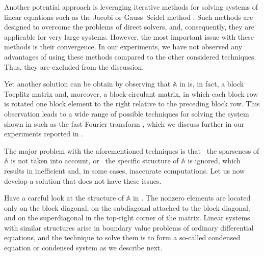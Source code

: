 Another potential approach is leveraging iterative methods for solving systems
of linear equations such as the Jacobi or Gauss--Seidel method \cite{press2007}.
Such methods are designed to overcome the problems of direct solvers, and,
consequently, they are applicable for very large systems. However, the most
important issue with these methods is their convergence. In our experiments, we
have not observed any advantages of using these methods compared to the other
considered techniques. Thus, they are excluded from the discussion.

Yet another solution can be obtain by observing that $\mathbb{A}$ in
 is, in fact, a block Toeplitz matrix and,
moreover, a block-circulant matrix, in which each block row is rotated one block
element to the right relative to the preceding block row. This observation leads
to a wide range of possible techniques for solving the system shown in
 such as the fast Fourier transform
\cite{mazancourt1983}, which we discuss further in our experiments reported in
.

The major problem with the aforementioned techniques is that \one~the sparseness
of $\mathbb{A}$ is not taken into account, or \two~the specific structure of
$\mathbb{A}$ is ignored, which results in inefficient and, in some cases,
inaccurate computations. Let us now develop a solution that does not have these
issues.

Have a careful look at the structure of $\mathbb{A}$ in
. The nonzero elements are located only on the
block diagonal, on the subdiagonal attached to the block diagonal, and on the
superdiagonal in the top-right corner of the matrix. Linear systems with similar
structures arise in boundary value problems of ordinary differential equations,
and the technique to solve them is to form a so-called condensed equation or
condensed system \cite{stoer2002} as we describe next.

